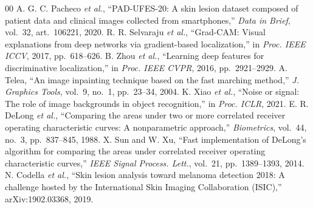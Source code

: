 \documentclass[conference]{IEEEtran}
\begin{document}
\begin{thebibliography}{00}
 A. G. C. Pacheco \emph{et al.}, ``PAD-UFES-20: A skin lesion dataset composed of patient data and clinical images collected from smartphones,'' \emph{Data in Brief}, vol.~32, art.~106221, 2020.
 R. R. Selvaraju \emph{et al.}, ``Grad-CAM: Visual explanations from deep networks via gradient-based localization,'' in \emph{Proc. IEEE ICCV}, 2017, pp.~618--626.
 B. Zhou \emph{et al.}, ``Learning deep features for discriminative localization,'' in \emph{Proc. IEEE CVPR}, 2016, pp.~2921--2929.
 A. Telea, ``An image inpainting technique based on the fast marching method,'' \emph{J. Graphics Tools}, vol.~9, no.~1, pp.~23--34, 2004.
 K. Xiao \emph{et al.}, ``Noise or signal: The role of image backgrounds in object recognition,'' in \emph{Proc. ICLR}, 2021.
 E. R. DeLong \emph{et al.}, ``Comparing the areas under two or more correlated receiver operating characteristic curves: A nonparametric approach,'' \emph{Biometrics}, vol.~44, no.~3, pp.~837--845, 1988.
 X. Sun and W. Xu, ``Fast implementation of DeLong's algorithm for comparing the areas under correlated receiver operating characteristic curves,'' \emph{IEEE Signal Process. Lett.}, vol.~21, pp.~1389--1393, 2014.
 N. Codella \emph{et al.}, ``Skin lesion analysis toward melanoma detection 2018: A challenge hosted by the International Skin Imaging Collaboration (ISIC),'' arXiv:1902.03368, 2019.
\end{thebibliography}
\end{document}
